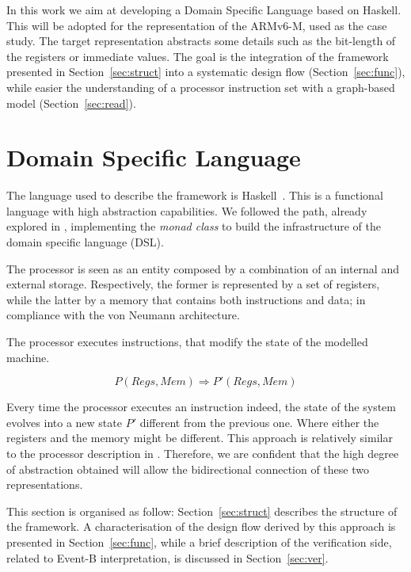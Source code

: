 \documentclass[conference]{IEEEtran}
\begin{document}
In this work we aim at developing a Domain Specific Language based on Haskell. This will be
adopted for the representation of the ARMv6-M, used as the case study. The target
representation abstracts some details such as the bit-length of the registers or immediate
values. The goal is the integration of the framework presented in Section~\ref{sec:struct}
into a systematic design flow (Section~\ref{sec:func}), while easier the understanding of
a processor instruction set with a graph-based model (Section~\ref{sec:read}).


\section{Domain Specific Language}
\label{sec:dsl}
The language used to describe the framework is Haskell~\cite{haskell}. This is a 
functional language with high abstraction capabilities.
We followed the path, already explored in \cite{armv7}, implementing the \textit{monad class}
to build the infrastructure of the domain specific language (DSL).

The processor is seen as an entity composed by a combination of an internal and
external storage. Respectively, the former is represented by a set of registers,
while the latter by a memory that contains both instructions and data; in compliance with the
von Neumann architecture. 

The processor executes instructions, that modify the state of the modelled machine.

$$P(Regs, Mem) \Rightarrow P'(Regs, Mem)$$

\noindent Every time the processor executes an instruction indeed, the state of the system
evolves into a new state $P'$ different from the previous one. Where either the registers and
the memory might be different. This approach is relatively similar to the processor
description in \cite{isaFunc}. Therefore, we are confident that the high degree of
abstraction obtained will allow the bidirectional connection of these two representations.

This section is organised as follow: Section~\ref{sec:struct} describes the structure of the
framework. A characterisation of the design flow derived by this approach is presented in
Section~\ref{sec:func}, while a brief description of the verification side, related to Event-B
interpretation, is discussed in Section~\ref{sec:ver}.
\end{document}
